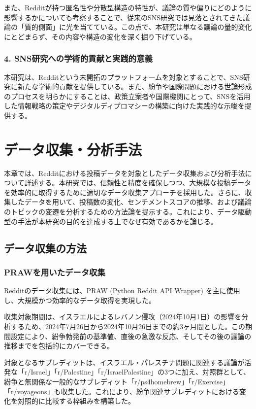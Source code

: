 \documentclass[11pt, a4j]{jreport}
\begin{document}
    また、Redditが持つ匿名性や分散型構造の特性が、議論の質や偏りにどのように影響するかについても考察することで、従来のSNS研究では見落とされてきた議論の「質的側面」に光を当てている。この点で、本研究は単なる議論の量的変化にとどまらず、その内容や構造の変化を深く掘り下げている。

    \subsection*{4. SNS研究への学術的貢献と実践的意義}
    本研究は、Redditという未開拓のプラットフォームを対象とすることで、SNS研究に新たな学術的貢献を提供している。また、紛争や国際問題における世論形成のプロセスを明らかにすることは、政策立案者や国際機関にとって、SNSを活用した情報戦略の策定やデジタルディプロマシーの構築に向けた実践的な示唆を提供する。

    \chapter{データ収集・分析手法}
    本章では、Redditにおける投稿データを対象としたデータ収集および分析手法について詳述する。本研究では、信頼性と精度を確保しつつ、大規模な投稿データを効率的に取得するために適切なデータ収集アプローチを採用した。さらに、収集したデータを用いて、投稿数の変化、センチメントスコアの推移、および議論のトピックの変遷を分析するための方法論を提示する。これにより、データ駆動型の手法が本研究の目的を達成する上でなぜ有効であるかを論じる。

    \section{データ収集の方法}
    \subsection{PRAWを用いたデータ収集}
    Redditのデータ収集には、PRAW (Python Reddit API Wrapper) を主に使用し、大規模かつ効率的なデータ取得を実現した。

    収集対象期間は、イスラエルによるレバノン侵攻（2024年10月1日）の影響を分析するため、2024年7月26日から2024年10月26日までの約3ヶ月間とした。この期間設定により、紛争勃発前の基準値、直後の急激な反応、そしてその後の議論の推移までを包括的にカバーできる。

    対象となるサブレディットは、イスラエル・パレスチナ問題に関連する議論が活発な「r/Israel」「r/Palestine」「r/IsraelPalestine」の3つに加え、対照群として、紛争と無関係な一般的なサブレディット「r/ps4homebrew」「r/Exercise」「r/voyageons」も収集した。これにより、紛争関連サブレディットにおける変化を対照的に比較する枠組みを構築した。
\end{document}
